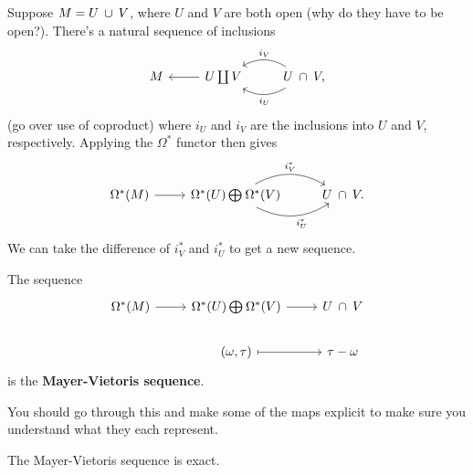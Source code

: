 \documentclass[twoside,10pt]{article}
\begin{document}
Suppose $M = U \operatorname{\;\cup\;} V$, where $U$ and $V$ are both open {\color{red}(why do they have to be open?)}. There's a natural sequence of inclusions
\[
\begin{tikzcd}
	M&U \coprod V \lar & U \isct V\lar[bend left]{i_{U}}\arrow[l, bend right, "i_{V}"'],
\end{tikzcd}
\] {\color{red}(go over use of coproduct)} where $i_{U}$ and $i_{V}$ are the inclusions into $U$ and $V$, respectively. Applying the $\Omega^{*}$ functor then gives
\[
\begin{tikzcd}
	\Omega^{*}(M) \rar & \Omega^{*}(U) \bigoplus_{}\Omega^{*}(V) \rar[bend left]{i_{V}^*}\arrow[r, bend right, "i_{U}^*"'] & U \isct V.
\end{tikzcd}
\] We can take the difference of $i_{V}^{*}$ and $i_{U}^{*}$ to get a new sequence.

\begin{defn}[]
The sequence
\[
\begin{tikzcd}
        \Omega^{*}(M) \rar & \Omega^{*}(U) \bigoplus_{}\Omega^{*}(V) \rar & U \isct V\\
			   & (\omega, \tau) \rar[maps to]&\tau-\omega
\end{tikzcd}
\] 
is the \textbf{Mayer-Vietoris sequence}.
\end{defn}
{\color{red}You should go through this and make some of the maps explicit to make sure you understand what they each represent.}

\begin{thrm}[]
The Mayer-Vietoris sequence is exact.
\end{thrm}
\end{document}
